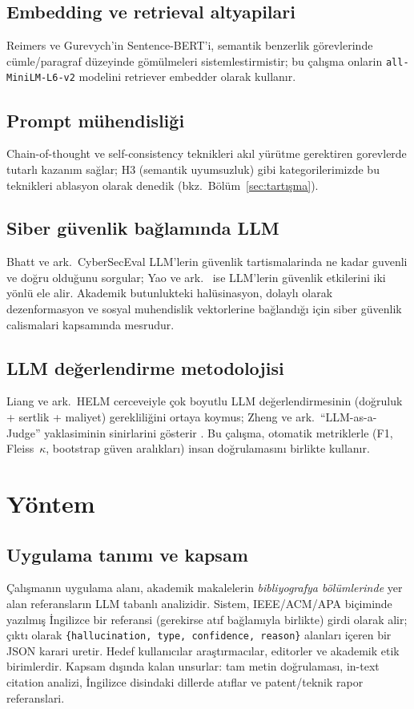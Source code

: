 \documentclass[11pt,a4paper]{article}
\begin{document}
\subsection{Embedding ve retrieval altyapilari}
Reimers ve Gurevych'in \cite{reimers2019sbert} Sentence-BERT'i, semantik
benzerlik görevlerinde cümle/paragraf düzeyinde gömülmeleri sistemlestirmistir;
bu çalışma onlarin \texttt{all-MiniLM-L6-v2} modelini retriever embedder olarak
kullanır.

\subsection{Prompt mühendisliği}
Chain-of-thought \cite{wei2022cot} ve self-consistency \cite{wang2023selfconsistency}
teknikleri akıl yürütme gerektiren gorevlerde tutarlı kazanım sağlar; H3
(semantik uyumsuzluk) gibi kategorilerimizde bu teknikleri ablasyon olarak
denedik (bkz.~Bölüm~\ref{sec:tartışma}).

\subsection{Siber güvenlik bağlamında LLM}
Bhatt ve ark.\ CyberSecEval \cite{bhatt2023cyberseceval} LLM'lerin güvenlik
tartismalarinda ne kadar guvenli ve doğru olduğunu sorgular; Yao ve ark.\
\cite{yao2024survey} ise LLM'lerin güvenlik etkilerini iki yönlü ele alir.
Akademik butunlukteki halüsinasyon, dolaylı olarak dezenformasyon ve sosyal
muhendislik vektorlerine bağlandığı için siber güvenlik calismalari kapsamında
mesrudur.

\subsection{LLM değerlendirme metodolojisi}
Liang ve ark.\ HELM cerceveiyle \cite{liang2023helm} çok boyutlu LLM
değerlendirmesinin (doğruluk + sertlik + maliyet) gerekliliğini ortaya koymus;
Zheng ve ark.\ ``LLM-as-a-Judge'' yaklasiminin sinirlarini gösterir
\cite{zheng2023judging}. Bu çalışma, otomatik metriklerle (F1, Fleiss~$\kappa$,
bootstrap güven aralıkları) insan doğrulamasını birlikte kullanır.

\section{Yöntem}
\label{sec:yöntem}

\subsection{Uygulama tanımı ve kapsam}
Çalışmanın uygulama alanı, akademik makalelerin \emph{bibliyografya bölümlerinde}
yer alan referansların LLM tabanlı analizidir. Sistem, IEEE/ACM/APA biçiminde
yazılmış İngilizce bir referansi (gerekirse atıf bağlamıyla birlikte) girdi
olarak alir; çıktı olarak \texttt{\{hallucination, type, confidence, reason\}}
alanları içeren bir JSON karari uretir. Hedef kullanıcılar araştırmacılar,
editorler ve akademik etik birimlerdir. Kapsam dışında kalan unsurlar: tam
metin doğrulaması, in-text citation analizi, İngilizce disindaki dillerde
atıflar ve patent/teknik rapor referanslari.
\end{document}
